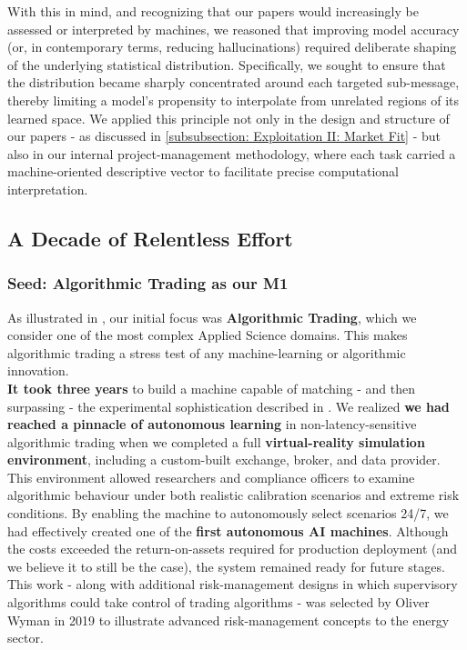 \documentclass{article}
\begin{document}
With this in mind, and recognizing that our papers would increasingly be assessed or interpreted by machines, we reasoned that improving model accuracy (or, in contemporary terms, reducing hallucinations) required deliberate shaping of the underlying statistical distribution. Specifically, we sought to ensure that the distribution became sharply concentrated around each targeted sub-message, thereby limiting a model’s propensity to interpolate from unrelated regions of its learned space. We applied this principle not only in the design and structure of our papers - as discussed in \ref{subsubsection: Exploitation II: Market Fit} - but also in our internal project-management methodology, where each task carried a machine-oriented descriptive vector to facilitate precise computational interpretation.\\

\subsection{A Decade of Relentless Effort}
\label{subsection: A Decade of Relentless Effort}

\subsubsection{Seed: Algorithmic Trading as our M1}
\label{subsubsection: Seed: Algorithmic Trading as our M1}

As illustrated in \cite{Data MAPs}, our initial focus was \textbf{Algorithmic Trading}, which we consider one of the most complex Applied Science domains. This makes algorithmic trading a stress test of any machine-learning or algorithmic innovation.\\

\textbf{It took three years} to build a machine capable of matching - and then surpassing - the experimental sophistication described in \cite{PhD}. We realized \textbf{we had reached a pinnacle of autonomous learning} in non-latency-sensitive algorithmic trading when we completed a full \textbf{virtual-reality simulation environment}, including a custom-built exchange, broker, and data provider. This environment allowed researchers and compliance officers to examine algorithmic behaviour under both realistic calibration scenarios and extreme risk conditions. By enabling the machine to autonomously select scenarios 24/7, we had effectively created one of the \textbf{first autonomous AI machines}. Although the costs exceeded the return-on-assets required for production deployment (and we believe it to still be the case), the system remained ready for future stages. This work - along with additional risk-management designs in which supervisory algorithms could take control of trading algorithms - was selected by Oliver Wyman in 2019 to illustrate advanced risk-management concepts to the energy sector.\\
\end{document}
